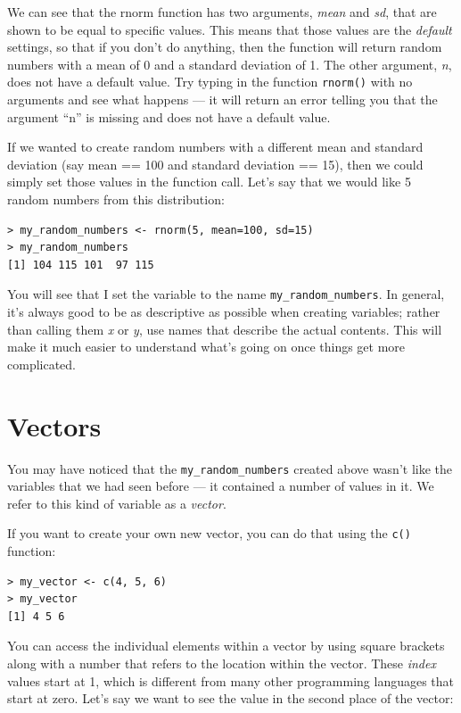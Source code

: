\documentclass[12pt,]{book}
\begin{document}
We can see that the rnorm function has two arguments, \emph{mean} and \emph{sd}, that are shown to be equal to specific values. This means that those values are the \emph{default} settings, so that if you don't do anything, then the function will return random numbers with a mean of 0 and a standard deviation of 1. The other argument, \emph{n}, does not have a default value. Try typing in the function \texttt{rnorm()} with no arguments and see what happens --- it will return an error telling you that the argument ``n'' is missing and does not have a default value.

If we wanted to create random numbers with a different mean and standard deviation (say mean == 100 and standard deviation == 15), then we could simply set those values in the function call. Let's say that we would like 5 random numbers from this distribution:

\begin{verbatim}
> my_random_numbers <- rnorm(5, mean=100, sd=15)
> my_random_numbers
[1] 104 115 101  97 115
\end{verbatim}

You will see that I set the variable to the name \texttt{my\_random\_numbers}. In general, it's always good to be as descriptive as possible when creating variables; rather than calling them \emph{x} or \emph{y}, use names that describe the actual contents. This will make it much easier to understand what's going on once things get more complicated.

\hypertarget{vectors}{%
\section{Vectors}\label{vectors}}

You may have noticed that the \texttt{my\_random\_numbers} created above wasn't like the variables that we had seen before --- it contained a number of values in it. We refer to this kind of variable as a \emph{vector}.

If you want to create your own new vector, you can do that using the \texttt{c()} function:

\begin{verbatim}
> my_vector <- c(4, 5, 6)
> my_vector
[1] 4 5 6
\end{verbatim}

You can access the individual elements within a vector by using square brackets along with a number that refers to the location within the vector. These \emph{index} values start at 1, which is different from many other programming languages that start at zero.
Let's say we want to see the value in the second place of the vector:
\end{document}
